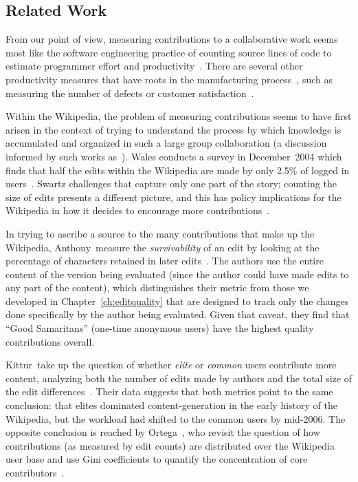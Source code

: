 \subsection{Related Work}

From our point of view, measuring contributions to a collaborative
work seems most like the software engineering practice of counting
source lines of code to estimate programmer effort and
productivity~\cite{Schultz1988,Park1992}.
There are several other productivity measures that have
roots in the manufacturing process~\cite{Diewart2005},
such as measuring the number of defects or customer
satisfaction~\cite{Tennant2001}.

Within the Wikipedia, the problem of measuring contributions
seems to have first arisen in the context of trying to understand
the process by which knowledge is accumulated and organized
in such a large group collaboration (a discussion informed
by such works
as~\cite{Butler2002,Benkler2002,Surowiecki2004,Reagle2004}).
Wales conducts a survey in December~2004 which finds that half
the edits within the Wikipedia are made by only 2.5\% of logged
in users~\cite{Wales2005}.
Swartz challenges that  capture only one part of the
story; counting the size of edits presents a different picture,
and this has policy implications for the Wikipedia in how
it decides to encourage more contributions~\cite{Swartz2006}.

In trying to ascribe a source to the many contributions
that make up the Wikipedia, Anthony~\etal measure the
\textit{survivability} of an edit by looking at the percentage of
characters retained in later edits~\cite{Anthony2005}.
The authors use the entire content of the version being
evaluated (since the author could have made edits to any
part of the content), which distinguishes their metric
from those we developed in Chapter~\ref{ch:editquality}
that are designed to track only the changes done specifically
by the author being evaluated.
Given that caveat, they find that ``Good Samaritans'' (one-time
anonymous users) have the highest quality contributions overall.

Kittur~\etal take up the question of whether \textit{elite}
or \textit{common} users contribute more content, analyzing both
the number of edits made by authors and the total size of the
edit differences~\cite{Kittur2007}.
Their data suggests that both metrics point to the same
conclusion: that elites dominated content-generation in the early
history of the Wikipedia, but the workload had shifted to
the common users by mid-2006.
The opposite conclusion is reached by Ortega~\etal,
who revisit the question of how contributions (as measured by
edit counts) are distributed over the Wikipedia user base and use
Gini coefficients to quantify the concentration of
core contributors~\cite{Ortega2008}.


